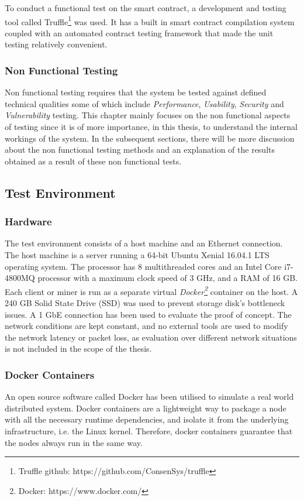 \documentclass[english]{tktltiki}
\begin{document}
To conduct a functional test on the smart contract, a development and testing tool called Truffle\footnote{Truffle github: https://github.com/ConsenSys/truffle} was used. It has a built in smart contract compilation system coupled with an automated contract testing framework that made the unit testing relatively convenient.

\subsubsection{Non Functional Testing}
Non functional testing requires that the system be tested against defined technical qualities some of which include \textit{Performance}, \textit{Usability}, \textit{Security} and \textit{Vulnerability} testing. This chapter mainly focuses on the non functional aspects of testing since it is of more importance, in this thesis, to understand the internal workings of the system. In the subsequent sections, there will be more discussion about the non functional testing methods and an explanation of the results obtained as a result of these non functional tests.
\subsection{Test Environment} \label{Section: Test Environment}
\subsubsection{Hardware}
The test environment consists of a host machine and an Ethernet connection. The host machine is a server running a 64-bit Ubuntu Xenial 16.04.1 LTS operating system. The processor has 8 multithreaded cores and an Intel Core i7-4800MQ processor with a maximum clock speed of 3 GHz, and a RAM of 16 GB. Each client or miner is run as a separate virtual \textit{Docker\footnote{Docker: https://www.docker.com/}} container on the host. A 240 GB Solid State Drive (SSD) was used to prevent storage disk's bottleneck issues. A 1 GbE connection has been used to evaluate the proof of concept. The network conditions are kept constant, and no external tools are used to modify the network latency or packet loss, as evaluation over different network situations is not included in the scope of the thesis.

\subsubsection{Docker Containers}
An open source software called Docker has been utilised to simulate a real world distributed system. Docker containers are a lightweight way to package a node with all the necessary runtime dependencies, and isolate it from the underlying infrastructure, i.e. the Linux kernel. Therefore, docker containers guarantee that the nodes always run in the same way. 
\end{document}
